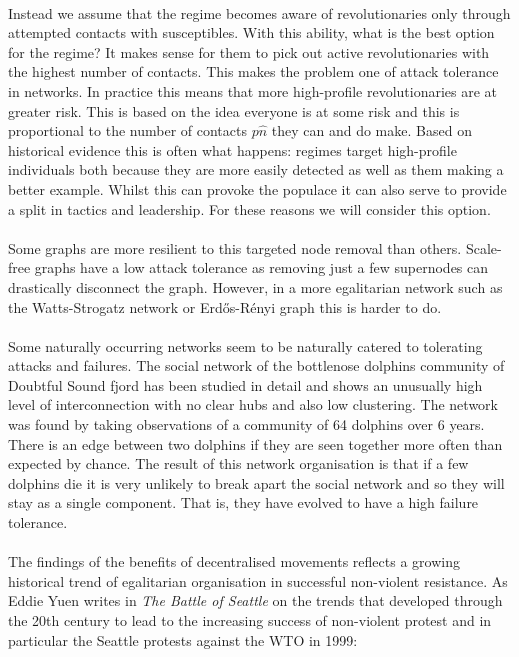 \\
Instead we assume that the regime becomes aware of revolutionaries only through attempted contacts with susceptibles. With this ability, what is the best option for the regime? It makes sense for them to pick out active revolutionaries with the highest number of contacts. This makes the problem one of attack tolerance in networks\cite{attack-tolerence-network}. In practice this means that more high-profile revolutionaries are at greater risk. This is based on the idea everyone is at some risk and this is proportional to the number of contacts $p\hat n$ they can and do make. Based on historical evidence this is often what happens: regimes target high-profile individuals both because they are more easily detected as well as them making a better example. Whilst this can provoke the populace it can also serve to provide a split in tactics and leadership. For these reasons we will consider this option.\\
\\
Some graphs are more resilient to this targeted node removal than others. Scale-free graphs have a low attack tolerance as removing just a few supernodes can drastically disconnect the graph. However, in a more egalitarian network such as the Watts-Strogatz network or Erd{\H{o}}s-R{\'{e}}nyi graph this is harder to do\cite{attack-tolerence-network}.\\
\\
Some naturally occurring networks seem to be naturally catered to tolerating attacks and failures. The social network of the bottlenose dolphins community of Doubtful Sound fjord has been studied in detail and shows an unusually high level of interconnection with no clear hubs and also low clustering\cite{dolphin-network}. The network was found by taking observations of a community of 64 dolphins over 6 years. There is an edge between two dolphins if they are seen together more often than expected by chance.
\label{mmd} The result of this network organisation is that if a few dolphins die it is very unlikely to break apart the social network and so they will stay as a single component. That is, they have evolved to have a high failure tolerance.\\
\\
The findings of the benefits of decentralised movements reflects a growing historical trend of egalitarian organisation in successful non-violent resistance\cite{battle-of-seattle}. As Eddie Yuen writes in \textit{The Battle of Seattle} on the trends that developed through the 20th century to lead to the increasing success of non-violent protest\cite{logic-non-violence} and in particular the Seattle protests against the WTO in 1999:
